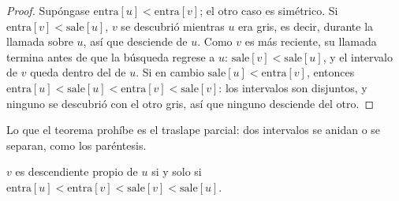 \documentclass[11pt,letterpaper]{article}
\begin{document}
\begin{proof}
  Supóngase $\text{entra}[u] < \text{entra}[v]$; el otro caso es
  simétrico. Si $\text{entra}[v] < \text{sale}[u]$, $v$ se descubrió
  mientras $u$ era gris, es decir, durante la llamada sobre $u$, así
  que desciende de $u$. Como $v$ es más reciente, su llamada termina
  antes de que la búsqueda regrese a $u$:
  $\text{sale}[v] < \text{sale}[u]$, y el intervalo de $v$ queda dentro
  del de $u$. Si en cambio $\text{sale}[u] < \text{entra}[v]$, entonces
  $\text{entra}[u] < \text{sale}[u] < \text{entra}[v] < \text{sale}[v]$:
  los intervalos son disjuntos, y ninguno se descubrió con el otro
  gris, así que ninguno desciende del otro.
\end{proof}

Lo que el teorema prohíbe es el traslape parcial: dos intervalos se
anidan o se separan, como los paréntesis.

\begin{corolario}
  \label{cor:busq-anidamiento}
  $v$ es descendiente propio de $u$ si y solo si
  $\text{entra}[u] < \text{entra}[v] < \text{sale}[v] < \text{sale}[u]$.
\end{corolario}
\end{document}
